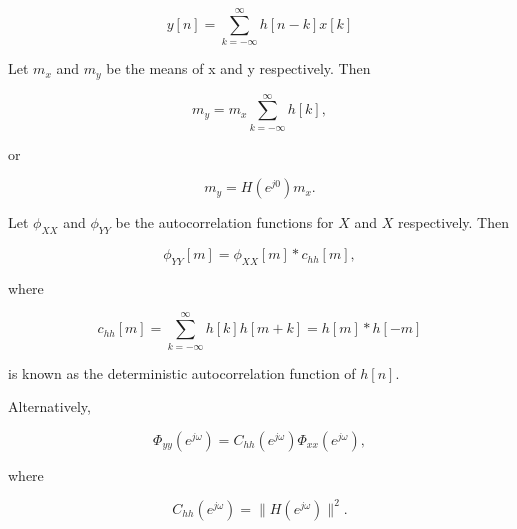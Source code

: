 \begin{equation*}
	y[n] = \sum_{k = -\infty} ^ \infty h[n - k]x[k]
\end{equation*}

Let $m_x$ and $m_y$ be the means of x and y respectively. Then

\begin{equation}
	m_y = m_x \sum_{k = -\infty} ^ \infty h[k],
\end{equation}

or

\begin{equation}
	m_y = H(e^{j0})m_x.
\end{equation}

Let $\phi_{XX}$ and $\phi_{YY}$ be the autocorrelation functions for $X$ and $X$ respectively. Then

\begin{equation}
	\phi_{YY}[m] = \phi_{XX}[m] \ast c_{hh}[m],
\end{equation}

where

\begin{equation}
	c_{hh}[m] = \sum_{k = -\infty} ^ {\infty} h[k] h[m + k] = h[m] \ast h[-m]
\end{equation}

is known as the deterministic autocorrelation function of $h[n]$.

\vspace{0.5cm}

Alternatively,

\begin{equation}
	\Phi_{yy}(e^{j\omega}) = C_{hh}(e^{j\omega})\Phi_{xx}(e^{j\omega}),
\end{equation}

where

\begin{equation}
	C_{hh}(e^{j\omega}) = \|H(e^{j\omega})\|^2.
\end{equation}

